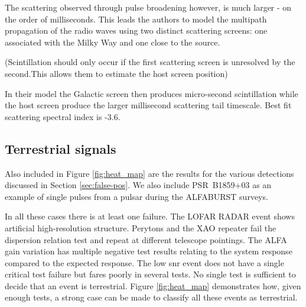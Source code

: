 \documentclass[a4paper,fleqn,usenatbib]{mnras}
\begin{document}
The scattering observed through pulse broadening however, is much larger - on the order of milliseconds. This leads the authors to model the multipath propagation of the radio waves using two distinct scattering screens: one associated with the Milky Way and one close to the source. 

(Scintillation should only occur if the first scattering screen is unresolved by the second.This allows them to estimate the host screen position)

In their model the Galactic screen then produces micro-second scintillation while the host screen produce the larger millisecond scattering tail timescale. Best fit scattering spectral index is -3.6. 




\subsection{Terrestrial signals}

Also included in Figure \ref{fig:heat_map} are the results for the various
detections discussed in Section \ref{sec:false-pos}. We also include
PSR~B1859+03 as an example of single pulses from a pulsar during the ALFABURST
surveys.

In all these cases there is at least one failure.  The LOFAR RADAR event shows
artificial high-resolution structure.  Perytons and the XAO repeater fail the
dispersion relation test and repeat at different telescope pointings. The ALFA
gain variation has multiple negative test results relating to the system
response compared to the expected response.  The low \gls{snr} event does not
have a single critical test failure but fares poorly in several tests.  No
single test is sufficient to decide that an event is terrestrial. Figure
\ref{fig:heat_map} demonstrates how, given enough tests, a strong case can be
made to classify all these events as terrestrial.

%
\end{document}
